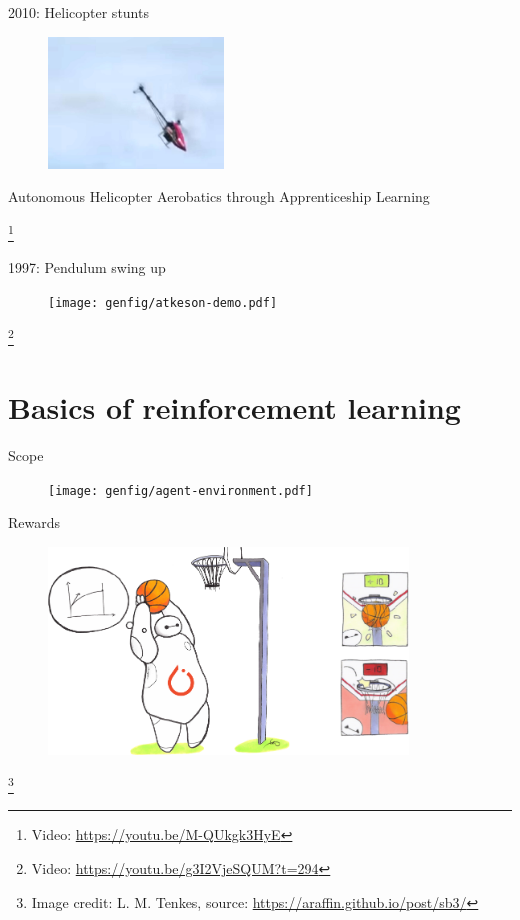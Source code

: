 \documentclass[11pt, aspectratio=169]{beamer}
\newcommand\blfootnote[1]{%
  \begingroup
  \renewcommand\thefootnote{}%
  \footnote{#1}%
  \addtocounter{footnote}{-1}%
  \endgroup
}
\begin{document}
\begin{frame}{2010: Helicopter stunts}
    \vspace{1.5em}
    \begin{figure}
        \includegraphics[height=3.5cm]{figures/helicopter-stunts.jpg}
    \end{figure}
    \begin{center}
        Autonomous Helicopter Aerobatics through Apprenticeship Learning~\cite{abbeel2010}
    \end{center}
    \blfootnote{
        Video: \url{https://youtu.be/M-QUkgk3HyE}
    }
\end{frame}

\begin{frame}{1997: Pendulum swing up~\cite{atkeson1997}}
    \vspace{1.5em}
    \begin{figure}
        \texttt{[image: genfig/atkeson-demo.pdf]}
    \end{figure}
    \blfootnote{
        Video: \url{https://youtu.be/g3I2VjeSQUM?t=294}
    }
\end{frame}


\section*{Basics of reinforcement learning}

\begin{frame}{Scope}
    \begin{figure}
        \texttt{[image: genfig/agent-environment.pdf]}
    \end{figure}
\end{frame}

\begin{frame}{Rewards}
    \begin{figure}
        \includegraphics[height=5.5cm]{figures/stable-baselines3-logo.png}
    \end{figure}
    \blfootnote{
        Image credit: L. M. Tenkes, source: \url{https://araffin.github.io/post/sb3/}
    }
\end{frame}
\end{document}
